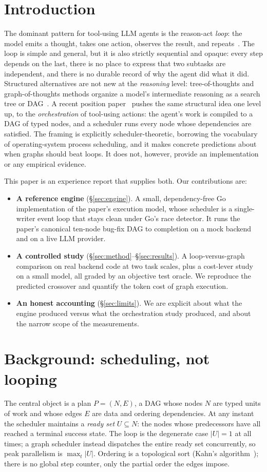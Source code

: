 \documentclass[11pt]{article}
\newcommand{\U}{\lvert U\rvert}
\begin{document}
\section{Introduction}
The dominant pattern for tool-using LLM agents is the reason-act \emph{loop}: the model emits a
thought, takes one action, observes the result, and repeats~\cite{react}. The loop is simple and
general, but it is also strictly sequential and opaque: every step depends on the last, there is
no place to express that two subtasks are independent, and there is no durable record of why the
agent did what it did. Structured alternatives are not new at the \emph{reasoning} level:
tree-of-thoughts and graph-of-thoughts methods organize a model's intermediate reasoning as a
search tree or DAG~\cite{tot,got}. A recent position paper~\cite{sgh2026} pushes the same
structural idea one level up, to the \emph{orchestration} of tool-using actions: the agent's work
is compiled to a DAG of typed nodes, and a scheduler runs every node whose dependencies are
satisfied. The framing is explicitly scheduler-theoretic, borrowing the vocabulary of
operating-system process scheduling, and it makes concrete predictions about when graphs should
beat loops. It does not, however, provide an implementation or any empirical evidence.

This paper is an experience report that supplies both. Our contributions are:
\begin{itemize}
\item \textbf{A reference engine} (\S\ref{sec:engine}). A small, dependency-free Go implementation
of the paper's execution model, whose scheduler is a single-writer event loop that stays clean
under Go's race detector. It runs the paper's canonical ten-node bug-fix DAG to completion on a
mock backend and on a live LLM provider.
\item \textbf{A controlled study} (\S\ref{sec:method}--\S\ref{sec:results}). A loop-versus-graph
comparison on real backend code at two task scales, plus a cost-lever study on a small model, all
graded by an objective test oracle. We reproduce the predicted crossover and quantify the token
cost of graph execution.
\item \textbf{An honest accounting} (\S\ref{sec:limits}). We are explicit about what the engine
produced versus what the orchestration study produced, and about the narrow scope of the
measurements.
\end{itemize}

\section{Background: scheduling, not looping}
\label{sec:bg}
The central object is a plan $P=(N,E)$, a DAG whose nodes $N$ are typed units of work and whose
edges $E$ are data and ordering dependencies. At any instant the scheduler maintains a
\emph{ready set} $U \subseteq N$: the nodes whose predecessors have all reached a terminal
success state. The loop is the degenerate case $\U = 1$ at all times; a graph scheduler instead
dispatches the entire ready set concurrently, so peak parallelism is $\max_t \U$. Ordering is a
topological sort (Kahn's algorithm~\cite{kahn}); there is no global step counter, only the partial
order the edges impose.
\end{document}
